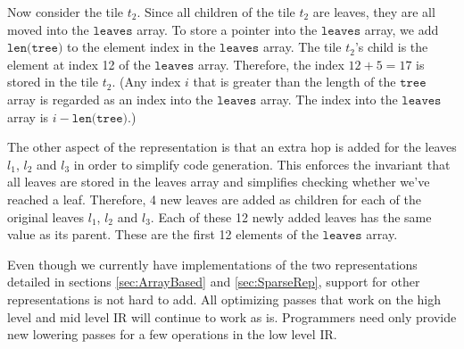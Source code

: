 Now consider the tile $t_2$. Since all children of the tile $t_2$ are leaves, they are all moved into the $\texttt{leaves}$ array. To store a pointer into the $\texttt{leaves}$ array, we add $\texttt{len(tree)}$ to the element index in the $\texttt{leaves}$ array. The tile $t_2$'s child is the element at index 12 of the $\texttt{leaves}$ array. Therefore, the index $12 + 5 = 17$ is stored in the tile $t_2$. (Any index $i$ that is greater than the length of the $\texttt{tree}$ array is regarded as an index into the $\texttt{leaves}$ array. The index into the $\texttt{leaves}$ array is $i - \texttt{len(tree)}$.)

The other aspect of the representation is that an extra hop is added for the leaves $l_1$, $l_2$ and $l_3$ in order to simplify code generation. This enforces the invariant that all leaves are stored in the leaves array and  simplifies checking whether we've reached a leaf. Therefore, 4 new leaves are added as children for each of the original leaves $l_1$, $l_2$ and $l_3$. Each of these 12 newly added leaves has the same value as its parent. These are the first 12 elements of the $\texttt{leaves}$ array.

Even though we currently have implementations of the two representations detailed in sections \ref{sec:ArrayBased} and \ref{sec:SparseRep}, support for other representations is not hard to add. All optimizing passes that work on the high level and mid level IR will continue to work as is. Programmers need only provide new lowering passes for a few operations in the low level IR.